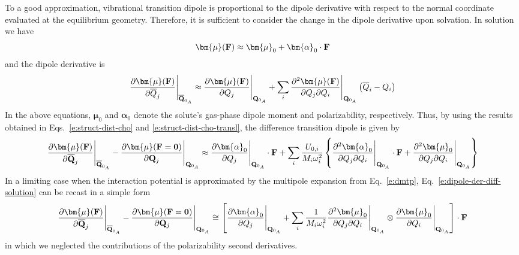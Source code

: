 \documentclass[a4paper,titlepage,twoside,fleqn,12pt]{book}
\newcommand{\BM}[1]{\bm{#1}}
\begin{document}
\begin{refsection}
To a good approximation, vibrational transition dipole is proportional to the dipole derivative 
with respect to the normal coordinate evaluated at the equilibrium geometry.
Therefore, it is sufficient to consider the change in the dipole derivative
upon solvation. In solution we have
%
\begin{equation} \label{e:dipole-solution}
{\BM \mu}({\bf F}) \approx {\BM \mu}_0 + {\BM \alpha}_0 \cdot {\bf F}
\end{equation}
%
and the dipole derivative is
%
\begin{equation} \label{e:dipole-der-solution}
 \frac{\partial{\BM \mu}({\bf F})}{\partial\overline{Q}_j} \Bigg|_{\overline{\bf Q}_{0_A}}
\approx 
 \frac{\partial{\BM \mu}({\bf F})}{\partial Q_j} \Bigg|_{{\bf Q}_{0_A}}
+
\sum_i \frac{\partial^2{\BM \mu}({\bf F})}{\partial Q_j \partial Q_i} \Bigg|_{{\bf Q}_{0_A}}
\left( \overline{Q}_i - Q_i\right)
\end{equation}
%
In the above equations, ${\BM \mu}_0$ and ${\BM \alpha}_0$ denote 
the solute's gas\hyp{}phase dipole moment
and polarizability, respectively.
Thus, by using the results obtained in Eqs.~\eqref{e:struct-dist-cho} 
and \eqref{e:struct-dist-cho-transl},
the difference transition dipole is given by
%
\begin{equation} \label{e:dipole-der-diff-solution}
\frac{\partial{\BM \mu}({\bf F})}{\partial\overline {\bf Q}_j} \Bigg|_{\overline{\bf Q}_{0_A}} -  
 \frac{\partial{\BM \mu}({\bf F}={\bf 0})}{\partial {\bf Q}_j} \Bigg|_{{\bf Q}_{0_A}} \approx
%
\frac{\partial{\BM \alpha}_0}{\partial Q_j} \Bigg|_{{\bf Q}_{0_A}} \cdot {\bf F}
+
\sum_i \frac{U_{0,i}}{M_i\omega_i^2} 
\left\{
\frac{\partial^2{\BM \alpha}_0}{\partial Q_j \partial Q_i} \Bigg|_{{\bf Q}_{0_A}} \cdot {\bf F}
+
\frac{\partial^2{\BM \mu}_0}{\partial Q_j \partial Q_i} \Bigg|_{{\bf Q}_{0_A}}
\right\}
\end{equation}
%
In a limiting case when
the interaction potential is approximated by the multipole expansion from
Eq.~\eqref{e:dmtp}, 
Eq.~\eqref{e:dipole-der-diff-solution} can be recast 
in a simple form
%
\begin{equation} \label{e:dipole-der-diff-solution-field}
 \frac{\partial{\BM \mu}({\bf F})}{\partial\overline {\bf Q}_j} \Bigg|_{\overline{\bf Q}_{0_A}} -  
 \frac{\partial{\BM \mu}({\bf F}={\bf 0})}{\partial {\bf Q}_j} \Bigg|_{{\bf Q}_{0_A}} \cong
%
\left[
\frac{\partial {\BM \alpha}_0}{\partial Q_j} \Bigg|_{{\bf Q}_{0_A}} 
+ 
\sum_i \frac{1}{M_i\omega_i^2} 
\frac{\partial^2 {\BM \mu}_0}{\partial Q_j \partial Q_i} \Bigg|_{{\bf Q}_{0_A}}
\otimes
\frac{\partial {\BM \mu}_0}{\partial Q_i} \Bigg|_{{\bf Q}_{0_A}}
\right] 
\cdot {\bf F}
\end{equation}
%
in which we neglected the contributions of the polarizability second derivatives.


\end{refsection}
\end{document}
